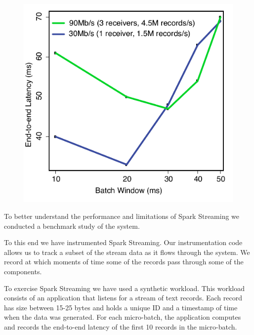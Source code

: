 \begin{figure}[t!]
  \begin{center}
    \includegraphics[scale=0.35]{images_graphs/batchsize_vs_latency/batchsize_vs_latency_illustrator.pdf}
  \end{center}
  \caption{}
  \label{fig:Batchsize_vs_latency}
\end{figure}



To better understand the performance and limitations of Spark Streaming we conducted a benchmark study of the system.

To this end we have instrumented Spark Streaming.
Our instrumentation code allows us to track a subset of the stream data as it flows through the system.
We record at which moments of time some of the records pass through some of the components.

To exercise Spark Streaming we have used a synthetic workload.
This workload consists of an application that listens for a stream of text records.
Each record has size between 15-25 bytes and holds a unique ID and a timestamp of time when the data was generated.
For each micro-batch, the application computes and records the end-to-end latency of the first 10 records in the micro-batch.

